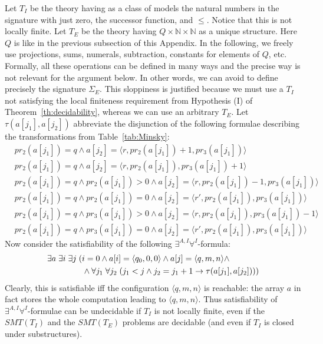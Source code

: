 \documentclass{LMCS}
\theoremstyle{plain}\newtheorem{assumption}[thm]{Assumption}
\theoremstyle{plain}\newtheorem{proposition}[thm]{Proposition}
\theoremstyle{plain}\newtheorem{property}[thm]{Property}
\theoremstyle{plain}\newtheorem{example}[thm]{Example}
\theoremstyle{plain}\newtheorem{claim}[thm]{Claim}
\theoremstyle{plain}\newtheorem{lemma}[thm]{Lemma}
\begin{document}
Let $T_I$ be the theory 
having as a class of models the
natural numbers in the signature with just
zero, the successor function, and $\leq$.  Notice that this is not
locally finite.  Let $T_E$ be the theory having $Q\times \mathbb
N\times \mathbb N$ as a unique structure. Here $Q$ is like in the
previous subsection of this Appendix.  In the following, we freely use
projections, sums, numerals, subtraction, constants for elements of
$Q$, etc.  Formally, all these 
operations 
can be defined in many ways and the precise way is not
 relevant for the argument below.  In other words, we can avoid
to define precisely the signature $\Sigma_E$.  
This sloppiness is justified because we
must use a 
$T_I$ not satisfying the local finiteness requirement from Hypothesis (I) of
Theorem~\ref{th:decidability}, whereas we can use an arbitrary $T_E$.  
Let $\tau(a[j_1], a[j_2])$ abbreviate
the disjunction of the following formulae describing the
transformations from Table~\ref{tab:Minsky}:
\begin{eqnarray*}
&
pr_2(a[j_1])=q \wedge a[j_2] = \langle r, pr_2(a[j_1])+1, pr_3(a[j_1])\rangle
\\
&
pr_2(a[j_1])=q \wedge a[j_2] = \langle r, pr_2(a[j_1]), pr_3(a[j_1])+1\rangle
\\
&
pr_2(a[j_1])=q \wedge pr_2(a[j_1])>0 \wedge a[j_2] = \langle r, pr_2(a[j_1])-1, pr_3(a[j_1])\rangle
\\
&
pr_2(a[j_1])=q \wedge pr_2(a[j_1])=0 \wedge a[j_2] = \langle r', pr_2(a[j_1]), pr_3(a[j_1])\rangle
\\
&
pr_2(a[j_1])=q \wedge pr_3(a[j_1])>0 \wedge a[j_2] = \langle r, pr_2(a[j_1]), pr_3(a[j_1])-1\rangle
\\
&
pr_2(a[j_1])=q \wedge pr_3(a[j_1])=0 \wedge a[j_2] = \langle r', pr_2(a[j_1]), pr_3(a[j_1])\rangle
\end{eqnarray*}
Now consider the satisfiability of the following
$\exists^{A,I}\forall^I$-formula:
\begin{eqnarray*}
&
\exists a\;\exists i\; \exists j\; 
(i=0 \wedge a[i]=\langle q_0, 0, 0\rangle \wedge a[j]=\langle q, m, n\rangle \wedge 
\\
& \hskip 1.5cm \wedge
\forall j_1\; \forall j_2\; (j_1<j \wedge j_2=j_1+1 \to \tau(a[j_1],a[j_2])))
\end{eqnarray*}
Clearly, this is satisfiable iff the configuration $\langle q, m,
n\rangle$ is reachable: the array $a$ in fact stores the whole
computation leading to $\langle q, m, n\rangle$. 
Thus satisfiability of $\exists^{A,I}\forall^I$-formulae can be
undecidable if $T_I$ is not locally finite, even if the $SMT(T_I)$ and
the $SMT(T_E)$ problems are decidable (and even if $T_I$ is closed
under substructures).
\end{document}
